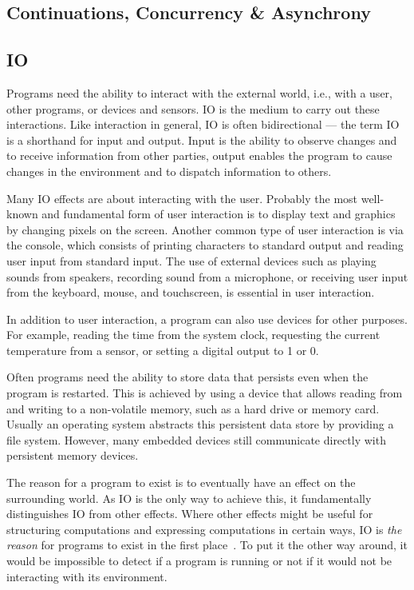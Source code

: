 \subsection{Continuations, Concurrency \& Asynchrony}


\subsection{IO}
Programs need the ability to interact with the external world, i.e., with a user, other programs, or devices and sensors. IO is the medium to carry out these interactions. Like interaction in general, IO is often bidirectional --- the term IO is a shorthand for input and output. Input is the ability to observe changes and to receive information from other parties, output enables the program to cause changes in the environment and to dispatch information to others.

Many IO effects are about interacting with the user. Probably the most well-known and fundamental form of user interaction is to display text and graphics by changing pixels on the screen. Another common type of user interaction is via the console, which consists of printing characters to standard output and reading user input from standard input. The use of external devices such as playing sounds from speakers, recording sound from a microphone, or receiving user input from the keyboard, mouse, and touchscreen, is essential in user interaction.

In addition to user interaction, a program can also use devices for other purposes. For example, reading the time from the system clock, requesting the current temperature from a sensor, or setting a digital output to 1 or 0.

Often programs need the ability to store data that persists even when the program is restarted. This is achieved by using a device that allows reading from and writing to a non-volatile memory, such as a hard drive or memory card. Usually an operating system abstracts this persistent data store by providing a file system. However, many embedded devices still communicate directly with persistent memory devices.

The reason for a program to exist is to eventually have an effect on the surrounding world. As IO is the only way to achieve this, it fundamentally distinguishes IO from other effects. Where other effects might be useful for structuring computations and expressing computations in certain ways, IO is \textit{the reason} for programs to exist in the first place~\cite{akward-squad}. To put it the other way around, it would be impossible to detect if a program is running or not if it would not be interacting with its environment.


